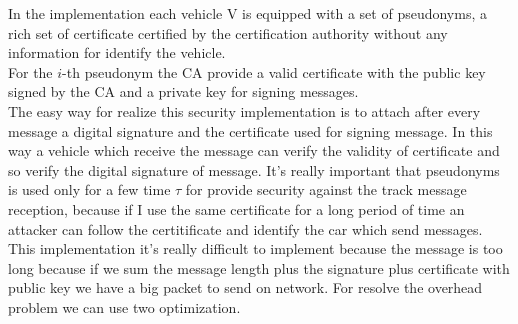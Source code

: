 In the \baseline implementation each vehicle V is equipped with a set of pseudonyms, a rich set of certificate certified by the certification authority without any information for identify the vehicle.\\
For the $i$-th pseudonym the CA provide a valid certificate with the public key signed by the CA and a private key for signing messages.\\
The easy way for realize this security implementation is to attach after every message a digital signature and the certificate used for signing message. In this way a vehicle which receive the message can verify the validity of certificate and so verify the digital signature of message. It's really important that pseudonyms is used only for a few time $\tau$ for provide security against the track message reception, because if I use the same certificate for a long period of time an attacker can follow the certitificate and identify the car which send messages. This implementation it's really difficult to implement because the message is too long because if we sum the message length plus the signature plus certificate with public key we have a big packet to send on network. For resolve the overhead problem we can use two optimization\cite{calandriello}.